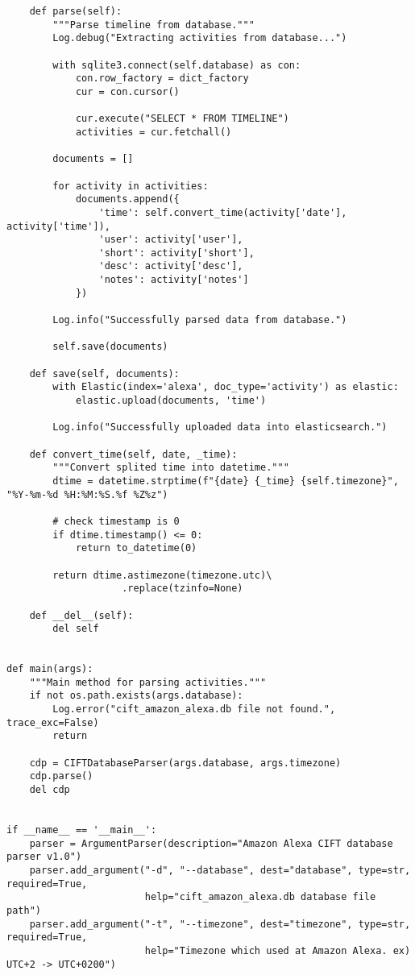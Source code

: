 \documentclass{easychair}
\begin{document}
\begin{enumerate}
\begin{lstlisting}
    def parse(self):
        """Parse timeline from database."""
        Log.debug("Extracting activities from database...")

        with sqlite3.connect(self.database) as con:
            con.row_factory = dict_factory
            cur = con.cursor()

            cur.execute("SELECT * FROM TIMELINE")
            activities = cur.fetchall()

        documents = []

        for activity in activities:
            documents.append({
                'time': self.convert_time(activity['date'], activity['time']),
                'user': activity['user'],
                'short': activity['short'],
                'desc': activity['desc'],
                'notes': activity['notes']
            })

        Log.info("Successfully parsed data from database.")

        self.save(documents)

    def save(self, documents):
        with Elastic(index='alexa', doc_type='activity') as elastic:
            elastic.upload(documents, 'time')

        Log.info("Successfully uploaded data into elasticsearch.")

    def convert_time(self, date, _time):
        """Convert splited time into datetime."""
        dtime = datetime.strptime(f"{date} {_time} {self.timezone}", "%Y-%m-%d %H:%M:%S.%f %Z%z")
        
        # check timestamp is 0
        if dtime.timestamp() <= 0:
            return to_datetime(0)

        return dtime.astimezone(timezone.utc)\
                    .replace(tzinfo=None)

    def __del__(self):
        del self


def main(args):
    """Main method for parsing activities."""
    if not os.path.exists(args.database):
        Log.error("cift_amazon_alexa.db file not found.", trace_exc=False)
        return

    cdp = CIFTDatabaseParser(args.database, args.timezone)
    cdp.parse()
    del cdp


if __name__ == '__main__':
    parser = ArgumentParser(description="Amazon Alexa CIFT database parser v1.0")
    parser.add_argument("-d", "--database", dest="database", type=str, required=True,
                        help="cift_amazon_alexa.db database file path")
    parser.add_argument("-t", "--timezone", dest="timezone", type=str, required=True,
                        help="Timezone which used at Amazon Alexa. ex) UTC+2 -> UTC+0200")


\end{lstlisting}
\end{enumerate}
\end{document}
